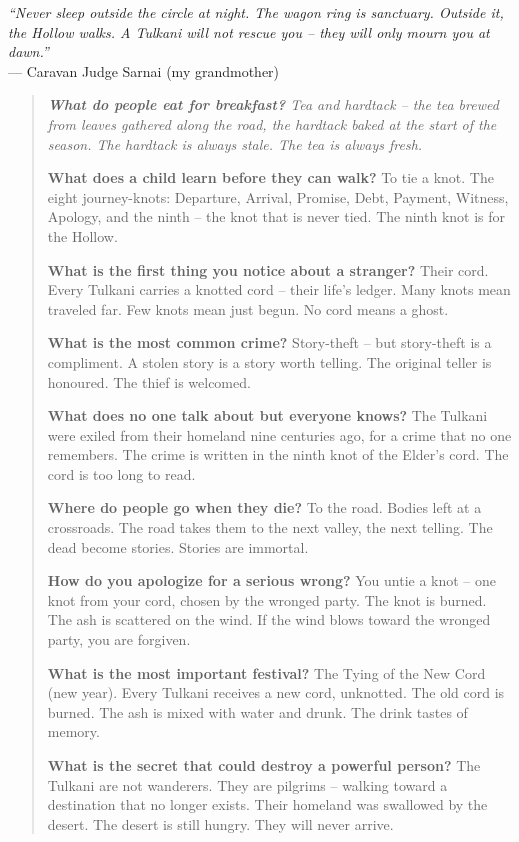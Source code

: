 \documentclass[12pt,oneside]{book}
\newenvironment{almanac}
  {\begin{quote}\small\itshape}
  {\end{quote}}
\begin{document}
\vspace{0.5em}
\noindent\textit{``Never sleep outside the circle at night. The wagon ring is sanctuary. Outside it, the Hollow walks. A Tulkani will not rescue you -- they will only mourn you at dawn.''} \\
--- Caravan Judge Sarnai (my grandmother)

\vspace{1em}
\begin{almanac}
\textbf{What do people eat for breakfast?} Tea and hardtack -- the tea brewed from leaves gathered along the road, the hardtack baked at the start of the season. The hardtack is always stale. The tea is always fresh.

\textbf{What does a child learn before they can walk?} To tie a knot. The eight journey-knots: Departure, Arrival, Promise, Debt, Payment, Witness, Apology, and the ninth -- the knot that is never tied. The ninth knot is for the Hollow.

\textbf{What is the first thing you notice about a stranger?} Their cord. Every Tulkani carries a knotted cord -- their life's ledger. Many knots mean traveled far. Few knots mean just begun. No cord means a ghost.

\textbf{What is the most common crime?} Story-theft -- but story-theft is a compliment. A stolen story is a story worth telling. The original teller is honoured. The thief is welcomed.

\textbf{What does no one talk about but everyone knows?} The Tulkani were exiled from their homeland nine centuries ago, for a crime that no one remembers. The crime is written in the ninth knot of the Elder's cord. The cord is too long to read.

\textbf{Where do people go when they die?} To the road. Bodies left at a crossroads. The road takes them to the next valley, the next telling. The dead become stories. Stories are immortal.

\textbf{How do you apologize for a serious wrong?} You untie a knot -- one knot from your cord, chosen by the wronged party. The knot is burned. The ash is scattered on the wind. If the wind blows toward the wronged party, you are forgiven.

\textbf{What is the most important festival?} The Tying of the New Cord (new year). Every Tulkani receives a new cord, unknotted. The old cord is burned. The ash is mixed with water and drunk. The drink tastes of memory.

\textbf{What is the secret that could destroy a powerful person?} The Tulkani are not wanderers. They are pilgrims -- walking toward a destination that no longer exists. Their homeland was swallowed by the desert. The desert is still hungry. They will never arrive.
\end{almanac}
\end{document}
